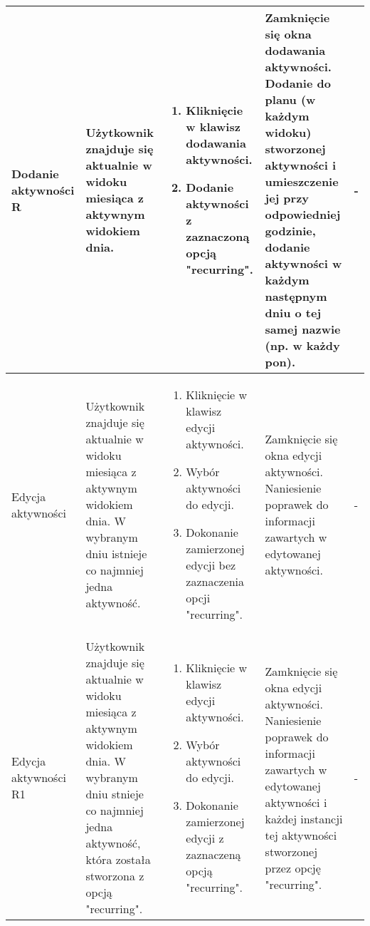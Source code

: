 \documentclass{article}
\begin{document}
\begin{flushleft}
\begin{longtable}[H]{| m{3.5cm} | m{3.5cm} | m{3.5cm} | m{3.5cm} | m{3.5cm} |}
	Dodanie aktywności R & Użytkownik znajduje się aktualnie w widoku miesiąca z aktywnym widokiem dnia. &  \begin{enumerate}[leftmargin =*, topsep=0pt] \item Kliknięcie w klawisz dodawania 
	aktywności. \item Dodanie aktywności z zaznaczoną opcją "recurring". \end{enumerate} & Zamknięcie się okna dodawania aktywności. Dodanie do planu (w każdym widoku) stworzonej aktywności 
	i umieszczenie jej przy odpowiedniej godzinie, dodanie aktywności w każdym następnym dniu o tej samej nazwie (np. w każdy pon). & -  \\ \hline

	Edycja aktywności & Użytkownik znajduje się aktualnie w widoku miesiąca z aktywnym widokiem dnia. W wybranym dniu istnieje co najmniej jedna aktywność. & \begin{enumerate}[leftmargin =*, 
	topsep=0pt] \item Kliknięcie w klawisz edycji aktywności. \item Wybór aktywności do edycji. \item Dokonanie zamierzonej edycji bez zaznaczenia opcji "recurring". \end{enumerate} & Zamknięcie 
	się okna edycji aktywności. Naniesienie poprawek do informacji zawartych w edytowanej aktywności. & - \\ \hline

	Edycja aktywności R1 & Użytkownik znajduje się aktualnie w widoku miesiąca z aktywnym widokiem dnia. W wybranym dniu stnieje co najmniej jedna aktywność, która została stworzona z opcją 
	"recurring". & \begin{enumerate}[leftmargin =*, topsep=0pt] \item Kliknięcie w klawisz edycji aktywności. \item Wybór aktywności do edycji. \item Dokonanie zamierzonej edycji z zaznaczeną 
	opcją "recurring". \end{enumerate} & Zamknięcie się okna edycji aktywności. Naniesienie poprawek do informacji zawartych w edytowanej aktywności i każdej instancji tej aktywności stworzonej 
	przez opcję "recurring".  & - \\ \hline


\end{longtable}
\end{flushleft}
\end{document}
